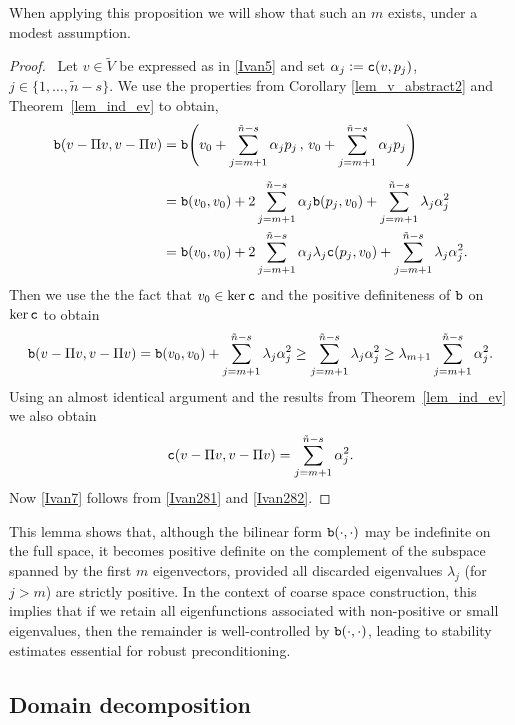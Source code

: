 \documentclass[numbers,webpdf,imaiai]{ima-authoring-template}%
\theoremstyle{thmstyletwo}%
\numberwithin{equation}{section}
\newcommand{\txtb}{\textup{\texttt{b}}}
\newcommand{\txtc}{\textup{\texttt{c}}}
\newcommand{\wV}{\widetilde{V}}
\newcommand{\assign}{\mathrel{\mathop:}=}
\numberwithin{equation}{section}
\begin{document}
{When applying this proposition we will show  that such an $m$ exists, under a modest assumption.
\begin{proof}\, 
Let $v \in {\wV}$ be expressed as in \eqref{Ivan5} and set $\alpha_j\assign\txtc(v,p_j)$, $j\in\{1,\ldots,\tilde n-s\}$. 
We use the properties from Corollary \ref{lem_v_abstract2} and Theorem~\ref{lem_ind_ev} to obtain,
\begin{align*}
	\txtb(v-\Pi v,v-\Pi v) &= \txtb\Biggl(v_0 + \sum_{j=m+1}^{\tilde n-s} \alpha_j p_j\, ,\, v_0 +  \sum_{j=m+1}^{\tilde n-s} \alpha_j p_j \Biggr)
	\nonumber\\[1ex]
	&= \txtb(v_0,v_0)   + 2 \sum_{j = m+1}^{\tilde n-s} \alpha_j \txtb( p_j, v_0) + \sum_{j=m+1}^{\tilde n-s}  \lambda_j \alpha_j^2 \nonumber                                 \\
	&= \txtb(v_0,v_0) +  2 \sum_{j = m+1}^{\tilde n-s} \alpha_j \lambda_j \txtc(p_j, v_0) +  \sum_{j=m+1}^{\tilde n-s} \lambda_j \alpha_j^2.
\end{align*}
Then we use the the fact that $v_0 \in \ker \txtc$ and the positive definiteness of $\txtb$ on $\ker \txtc$ to obtain 
\begin{equation} 
\label{Ivan281}
	\txtb(v-\Pi v,v-\Pi v)  = \txtb(v_0,v_0) + \sum_{j=m+1}^{\tilde n-s} \lambda_j \alpha_j^2 \ge \sum_{j=m+1}^{\tilde n-s} \lambda_j \alpha_j^2  
	\ge \lambda_{m+1} \sum_{j=m+1}^{\tilde n-s}  \alpha_j^2.
\end{equation}
Using an almost identical argument and the results from Theorem~\ref{lem_ind_ev} we also obtain
\begin{equation}
	\txtc(v-\Pi v,v-\Pi v) = \sum_{j=m+1}^{\tilde n-s}  \alpha_j^2.
\label{Ivan282}
\end{equation}
{Now \eqref{Ivan7}} follows from \eqref{Ivan281} and \eqref{Ivan282}. 
\end{proof}

This lemma shows that, although the bilinear form $\txtb(\cdot,\cdot)$ may be indefinite on the full space, 
it becomes positive definite on the complement of the subspace spanned by the first $m$ eigenvectors, 
provided all discarded eigenvalues $\lambda_{j}$ (for $j > m$) are strictly positive. 
In the context of coarse space construction, this implies that if we retain all eigenfunctions associated 
with non-positive or small eigenvalues, then the remainder is well-controlled by $\txtb(\cdot,\cdot)$, 
leading to stability estimates essential for robust preconditioning.


\subsection{Domain decomposition}

}
\end{document}
